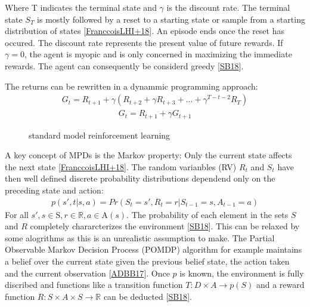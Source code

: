 \documentclass[letterpaper,10pt,english]{jupyterBook}
\let\sphinxpxdimen\pdfpxdimen\else\newdimen\sphinxpxdimen
\begin{document}
\sphinxAtStartPar
Where T indicates the terminal state and \(\gamma\) is the discount rate. The terminal state \(S_T\) is mostly followed by a reset to a starting state or sample from a starting distribution of states {[}\hyperlink{cite.Financial_application:id72}{FranccoisLHI+18}{]}. An episode ends once the reset has occured. The discount rate represents the present value of future rewards. If \(\gamma = 0\), the agent is myopic and is only concerned in maximizing the immediate rewards. The agent can consequently be considerd greedy {[}\hyperlink{cite.Financial_application:id70}{SB18}{]}.

\sphinxAtStartPar
The returns can be rewritten in a dynammic programming approach:
\begin{equation*}
\begin{split} G_t = R_{t+1} + \gamma(R_{t+2} + \gamma R_{t+3} + ... + \gamma^{T-t-2}R_T) \end{split}
\end{equation*}\begin{equation*}
\begin{split} G_t = R_{t+1} + \gamma G_{t+1}\end{split}
\end{equation*}
\begin{figure}[htbp]
\centering
\capstart

\noindent\sphinxincludegraphics[width=600\sphinxpxdimen,height=300\sphinxpxdimen]{{standard_model}.png}
\caption{standard model reinforcement learning}\label{\detokenize{Reinforcement_learning:standard-model-fig}}\end{figure}

\sphinxAtStartPar
A key concept of MPDs is the Markov property: Only the current state affects the next state {[}\hyperlink{cite.Financial_application:id72}{FranccoisLHI+18}{]}. The random varianbles (RV) \(R_t\) and \(S_t\) have then well defined discrete probability distributions dependend only on the preceding state and action:
\begin{equation*}
\begin{split} p(s', t| s, a) = Pr(S_t = s', R_t = r | S_{t-1} = s, A_{t-1}=a) \end{split}
\end{equation*}
\sphinxAtStartPar
For all \(s', s \in \mathrm{S} , r \in 	\mathbb{R}, a \in \mathrm{A}(s) \). The probability of each element in the sets \(S\) and \(R\) completely chararcterizes the environment {[}\hyperlink{cite.Financial_application:id70}{SB18}{]}. This can be relaxed by some alogrithms as this is an unrealistic assumption to make. The Partial Observable Markov Decision Process (POMDP) algorithm for example maintains a belief over the current state given the previous belief state, the action taken and the current observation {[}\hyperlink{cite.Financial_application:id63}{ADBB17}{]}.  Once \(p\) is known, the environment is fully discribed and functions like a transition function \(T : D \times A \to p(S)\) and a reward function \(R: S \times A \times S \to \mathbb{R}\) can be deducted {[}\hyperlink{cite.Financial_application:id70}{SB18}{]}.
\end{document}
